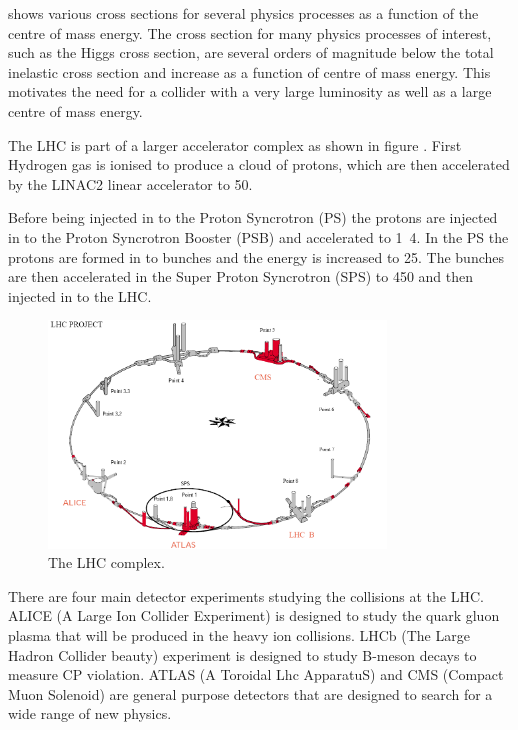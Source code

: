  shows various cross sections for several physics
processes as a function of the centre of mass energy. The cross section for many
physics processes of interest, such as the Higgs cross section, are several
orders of magnitude below the total inelastic cross section and increase as a
function of centre of mass energy. This motivates the need for a collider with a
very large luminosity as well as a large centre of mass energy.

The LHC is part of a larger accelerator complex as shown in figure
. First Hydrogen gas is ionised to produce a cloud of
protons, which are then accelerated by the LINAC2 linear accelerator to
\unit{50}{\MeV}.

Before being injected in to the Proton Syncrotron (PS) the protons are injected in to
the Proton Syncrotron Booster (PSB) and accelerated to \unit{1.4}{\GeV}. In the
PS the protons are formed in to bunches and the energy is increased to
\unit{25}{\GeV}. The bunches are then accelerated in the Super Proton
Syncrotron (SPS) to \unit{450}{\GeV} and then injected in to the LHC.


\begin{figure}[htb!]
  \centering
  \includegraphics[width=0.8\textwidth]{LHC}
  \caption{The LHC complex.}
  \label{fig:LHCcomplex}
\end{figure}

There are four main detector experiments studying the collisions at the LHC. 
ALICE (A Large Ion Collider Experiment) is designed to study the quark gluon
plasma that will be produced in the heavy ion collisions. 
LHCb (The Large Hadron Collider beauty) experiment is designed to study B-meson
decays to measure CP violation. 
ATLAS (A Toroidal Lhc ApparatuS) and CMS (Compact Muon Solenoid) are general
purpose detectors that are designed 
to search for a wide range of new physics.\cite{lhc}

